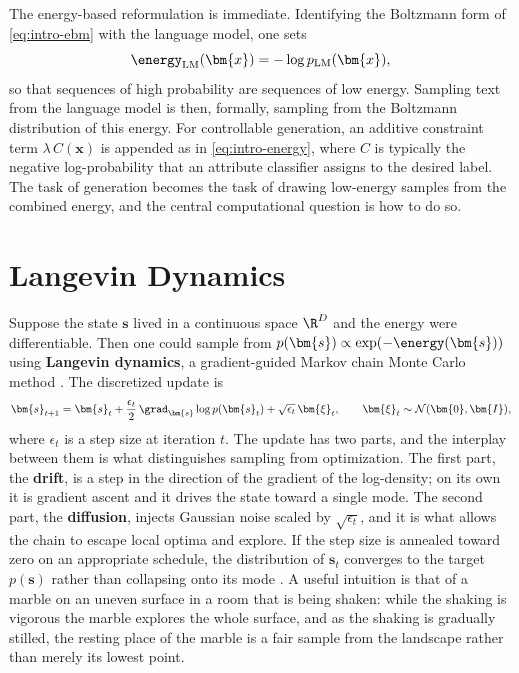 The energy-based reformulation is immediate. Identifying the Boltzmann form of \eqref{eq:intro-ebm} with the language model, one sets
\begin{equation}
    \energy_{\text{LM}}(\bm{x}) = -\log p_{\text{LM}}(\bm{x}),
    \label{eq:bg-energy}
\end{equation}
so that sequences of high probability are sequences of low energy. Sampling text from the language model is then, formally, sampling from the Boltzmann distribution of this energy. For controllable generation, an additive constraint term $\lambda\, C(\bm{x})$ is appended as in \eqref{eq:intro-energy}, where $C$ is typically the negative log-probability that an attribute classifier assigns to the desired label. The task of generation becomes the task of drawing low-energy samples from the combined energy, and the central computational question is how to do so.

\section{Langevin Dynamics}
\label{sec:bg-langevin}

Suppose the state $\bm{s}$ lived in a continuous space $\R^D$ and the energy were differentiable. Then one could sample from $p(\bm{s}) \propto \exp(-\energy(\bm{s}))$ using \textbf{Langevin dynamics}, a gradient-guided Markov chain Monte Carlo method \citep{roberts1996exponential, welling2011bayesian}. The discretized update is
\begin{equation}
    \bm{s}_{t+1} = \bm{s}_t + \frac{\epsilon_t}{2}\,\grad_{\bm{s}} \log p(\bm{s}_t) + \sqrt{\epsilon_t}\,\bm{\xi}_t, \qquad \bm{\xi}_t \sim \mathcal{N}(\bm{0}, \bm{I}),
    \label{eq:bg-langevin}
\end{equation}
where $\epsilon_t$ is a step size at iteration $t$. The update has two parts, and the interplay between them is what distinguishes sampling from optimization. The first part, the \textbf{drift}, is a step in the direction of the gradient of the log-density; on its own it is gradient ascent and it drives the state toward a single mode. The second part, the \textbf{diffusion}, injects Gaussian noise scaled by $\sqrt{\epsilon_t}$, and it is what allows the chain to escape local optima and explore. If the step size is annealed toward zero on an appropriate schedule, the distribution of $\bm{s}_t$ converges to the target $p(\bm{s})$ rather than collapsing onto its mode \citep{welling2011bayesian}. A useful intuition is that of a marble on an uneven surface in a room that is being shaken: while the shaking is vigorous the marble explores the whole surface, and as the shaking is gradually stilled, the resting place of the marble is a fair sample from the landscape rather than merely its lowest point.


